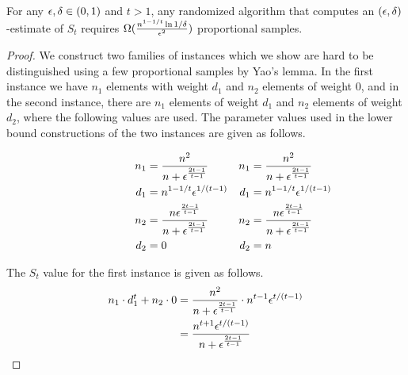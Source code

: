 \begin{thm} For any $\epsilon,\delta \in (0,1)$ and $t>1$, any randomized algorithm that computes an $(\epsilon,\delta)$-estimate of $S_t$ requires $\Omega(\frac{n^{1-1/t}\ln 1/\delta }{\epsilon^2})$ proportional samples. \end{thm}

\begin{proof} We construct two families of instances which we show are hard to be distinguished using a few proportional samples by Yao's lemma. In the first instance we have $n_1$ elements with weight $d_1$ and $n_2$ elements of weight $0$, and in the second instance, there are $n_1$ elements of weight $d_1$ and $n_2$ elements of weight $d_2$, where the following values are used. The parameter values used in the lower bound constructions of the two instances are given as follows. 


\begin{gather}
\begin{align*}
\qquad \qquad \quad n_1 & =  \frac{n^2}{n + \epsilon^{\frac{2t-1}{t-1}}} & n_1 & =  \frac{n^2}{n+ \epsilon^{\frac{2t-1}{t-1}}}\\
\qquad \qquad \quad d_1 & =  n^{1-1/t} \epsilon^{1/(t-1)} & d_1 & =  n^{1-1/t} \epsilon^{1/(t-1)}\\
\qquad \qquad \quad n_2 & =  \frac{n \epsilon^{\frac{2t-1}{t-1}}}{n + \epsilon^{\frac{2t-1}{t-1}}} & n_2 & =  \frac{n \epsilon^{\frac{2t-1}{t-1}}}{n + \epsilon^{\frac{2t-1}{t-1}}}\\
\qquad \qquad \quad d_2 & =  0 & d_2 & = n
\end{align*}
\end{gather}


\noindent The $S_t$ value for the first instance is given as follows.
\begin{align*}
n_1 \cdot d_1^t + n_2 \cdot 0
& = \frac{n^2}{n + \epsilon^{\frac{2t-1}{t-1}}} \cdot n^{t-1} \epsilon^{t/(t-1)}\\
& = \frac{n^{t+1} \epsilon^{t/(t-1)}}{n + \epsilon^{\frac{2t-1}{t-1}}} 
\end{align*}



\end{proof}
